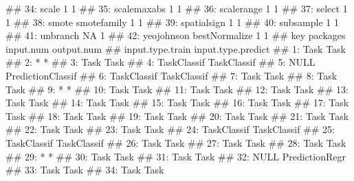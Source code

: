 \documentclass[]{article}
\newenvironment{Shaded}{}{}
\newcommand{\NormalTok}[1]{#1}
\renewenvironment{Shaded} {\begin{snugshade}\small} {\end{snugshade}}
\begin{document}
\begin{Shaded}
\begin{Highlighting}[]
\NormalTok{## 34:           scale                       1          1}
\NormalTok{## 35:     scalemaxabs                       1          1}
\NormalTok{## 36:      scalerange                       1          1}
\NormalTok{## 37:          select                       1          1}
\NormalTok{## 38:           smote   smotefamily         1          1}
\NormalTok{## 39:     spatialsign                       1          1}
\NormalTok{## 40:       subsample                       1          1}
\NormalTok{## 41:        unbranch                      NA          1}
\NormalTok{## 42:      yeojohnson bestNormalize         1          1}
\NormalTok{##                 key      packages input.num output.num}
\NormalTok{##     input.type.train input.type.predict}
\NormalTok{##  1:             Task               Task}
\NormalTok{##  2:                *                  *}
\NormalTok{##  3:             Task               Task}
\NormalTok{##  4:      TaskClassif        TaskClassif}
\NormalTok{##  5:             NULL  PredictionClassif}
\NormalTok{##  6:      TaskClassif        TaskClassif}
\NormalTok{##  7:             Task               Task}
\NormalTok{##  8:             Task               Task}
\NormalTok{##  9:                *                  *}
\NormalTok{## 10:             Task               Task}
\NormalTok{## 11:             Task               Task}
\NormalTok{## 12:             Task               Task}
\NormalTok{## 13:             Task               Task}
\NormalTok{## 14:             Task               Task}
\NormalTok{## 15:             Task               Task}
\NormalTok{## 16:             Task               Task}
\NormalTok{## 17:             Task               Task}
\NormalTok{## 18:             Task               Task}
\NormalTok{## 19:             Task               Task}
\NormalTok{## 20:             Task               Task}
\NormalTok{## 21:             Task               Task}
\NormalTok{## 22:             Task               Task}
\NormalTok{## 23:             Task               Task}
\NormalTok{## 24:      TaskClassif        TaskClassif}
\NormalTok{## 25:      TaskClassif        TaskClassif}
\NormalTok{## 26:             Task               Task}
\NormalTok{## 27:             Task               Task}
\NormalTok{## 28:             Task               Task}
\NormalTok{## 29:                *                  *}
\NormalTok{## 30:             Task               Task}
\NormalTok{## 31:             Task               Task}
\NormalTok{## 32:             NULL     PredictionRegr}
\NormalTok{## 33:             Task               Task}
\NormalTok{## 34:             Task               Task}

\end{Highlighting}
\end{Shaded}
\end{document}
